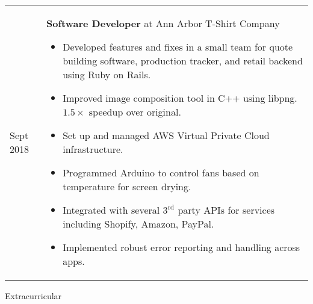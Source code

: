 \documentclass[11pt]{article}
\renewcommand{\section}[1]{{\LARGE{#1}}\vspace{2 mm}}
\newenvironment{timeline}
        {\begin{tabular}{p{21 mm}|p{150 mm}}}
        {\end{tabular}}
\newenvironment{timelinetitle}
        {\vspace{-2 mm}\begin{large}}
        {\end{large}\vspace{-1.5 mm}}
\newcommand{\timespan}[2]{{#2}\newline{#1}}
\begin{document}
\begin{timeline}
\timespan{Feb 2014}{Sept 2018}
&
\begin{timelinetitle}
  \textbf{Software Developer} \small{at Ann Arbor T-Shirt Company}
\end{timelinetitle}
\begin{itemize}
  \item[] Developed features and fixes in a small team for quote building software,
        production tracker, and retail backend using Ruby on Rails.

      \item[] Improved image composition tool in C++ using libpng. $1.5\times$ speedup over original.

      \item[] Set up and managed AWS Virtual Private Cloud infrastructure.

      \item[] Programmed Arduino to control fans based on temperature for screen drying.
  
      \item[] Integrated with several $3^\text{rd}$ party APIs for services including Shopify, Amazon, PayPal.

      \item[] Implemented robust error reporting and handling across apps.

\end{itemize}

\end{timeline}

\vspace{3.0 mm}
\section{Extracurricular}
\end{document}
